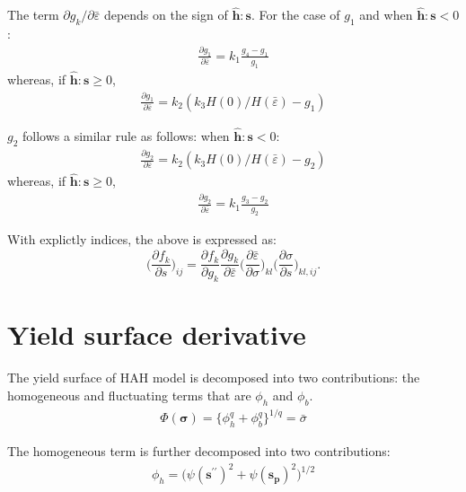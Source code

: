 \documentclass[12pt]{amsart}
\begin{document}
The term $  \partial{g_k}/\partial{\bar{\varepsilon}} $ depends on the sign of $\hat{\mathbf{h}}:\mathbf{s}$.
For the case of $g_1$ and when  $\hat{\mathbf{h}}:\mathbf{s}<0$:
\begin{eqnarray}
  \label{eq:dbau2}
\frac{\partial{g_1}}{\partial{\bar{\varepsilon}}}=k_1 \frac{g_4-g_1}{g_1}
\end{eqnarray}
whereas, if $\hat{\mathbf{h}}:\mathbf{s}\ge0$,
\begin{eqnarray}
  \label{eq:dbau3}
\frac{\partial{g_1}}{\partial{\bar{\varepsilon}}}=k_2 (k_3 H(0)/H(\bar{\varepsilon})-g_1)
\end{eqnarray}


$g_2$ follows a similar rule as follows:
when  $\hat{\mathbf{h}}:\mathbf{s}<0$:
\begin{eqnarray}
  \label{eq:dbau4}
  \frac{\partial{g_2}}{\partial{\bar{\varepsilon}}}=k_2 (k_3 H(0)/H(\bar{\varepsilon})-g_2)
\end{eqnarray}
whereas, if $\hat{\mathbf{h}}:\mathbf{s}\ge0$,
\begin{eqnarray}
  \label{eq:dbau5}
  \frac{\partial{g_2}}{\partial{\bar{\varepsilon}}}=k_1 \frac{g_3-g_2}{g_2}
\end{eqnarray}

With explictly indices, the above is expressed as:
\begin{equation}
  \label{eq:dphib8}
  \bigg(\frac{\partial f_k}{\partial s}\bigg)_{ij} = \frac{\partial f_k}{\partial g_k} \frac{\partial g_k}{\partial \bar{\varepsilon}}  \bigg(\frac{\partial\bar{\varepsilon}}{\partial\sigma}\bigg)_{kl} \bigg(\frac{\partial\sigma}{\partial s}\bigg)_{kl,ij}.
\end{equation}


\newpage
\section{Yield surface derivative}


The yield surface of HAH model is decomposed into two contributions: the homogeneous and fluctuating terms that are $\phi_h$ and $\phi_b$.
\begin{eqnarray}
  \label{eq:hah_def}
  \Phi(\mathbf{\sigma})=\{\phi_h^q + \phi_b^q \}^{1/q}=\bar{\sigma}
\end{eqnarray}

The homogeneous term is further decomposed into two contributions:
\begin{eqnarray}
  \label{eq:hah_homo}
  \phi_h = \big(\psi(\mathbf{s}^{\prime\prime})^2+\psi(\mathbf{s_p})^2\big)^{1/2}
\end{eqnarray}
\end{document}
